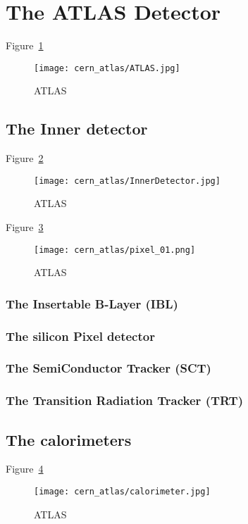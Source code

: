 \newpage
\section{The ATLAS Detector}
Figure~\ref{ATLAS}
\begin{figure}[htbp]
  \centering
  \texttt{[image: cern\_atlas/ATLAS.jpg]}
  \caption[ATLAS]{ATLAS}
  \label{ATLAS}
\end{figure}


\subsection{The Inner detector}
Figure~\ref{InnerDetector}
\begin{figure}[htbp]
  \centering
  \texttt{[image: cern\_atlas/InnerDetector.jpg]}

  \caption[ATLAS]{ATLAS}
  \label{InnerDetector}
\end{figure}


Figure~\ref{pixel}
\begin{figure}[htbp]
  \centering
  \texttt{[image: cern\_atlas/pixel\_01.png]}
  \caption[ATLAS]{ATLAS}
  \label{pixel}
\end{figure}


\subsubsection{The Insertable B-Layer (IBL)}
\subsubsection{The silicon Pixel detector}
\subsubsection{The SemiConductor Tracker (SCT)}
\subsubsection{The Transition Radiation Tracker (TRT)}

\subsection{The calorimeters}
Figure~\ref{calo}
\begin{figure}[htbp]
  \centering
  \texttt{[image: cern\_atlas/calorimeter.jpg]}
  \caption[ATLAS]{ATLAS}
  \label{calo}
\end{figure}



